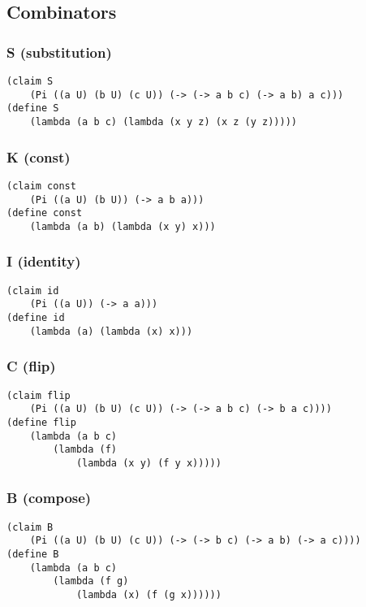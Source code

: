 \subsection{Combinators}

\subsubsection{S (substitution)} \label{code:S}
\begin{lstlisting}
(claim S
    (Pi ((a U) (b U) (c U)) (-> (-> a b c) (-> a b) a c)))
(define S
    (lambda (a b c) (lambda (x y z) (x z (y z)))))
\end{lstlisting}

\subsubsection{K (const)} \label{code:K}
\begin{lstlisting}
(claim const
    (Pi ((a U) (b U)) (-> a b a)))
(define const
    (lambda (a b) (lambda (x y) x)))
\end{lstlisting}

\subsubsection{I (identity)} \label{code:I}
\begin{lstlisting}
(claim id 
    (Pi ((a U)) (-> a a)))
(define id
    (lambda (a) (lambda (x) x)))
\end{lstlisting}

\subsubsection{C (flip)} \label{code:C}
\begin{lstlisting}
(claim flip
    (Pi ((a U) (b U) (c U)) (-> (-> a b c) (-> b a c))))
(define flip
    (lambda (a b c)
        (lambda (f)
            (lambda (x y) (f y x)))))
\end{lstlisting}

\subsubsection{B (compose)} \label{code:B}
\begin{lstlisting}
(claim B
    (Pi ((a U) (b U) (c U)) (-> (-> b c) (-> a b) (-> a c))))
(define B
    (lambda (a b c)
        (lambda (f g)
            (lambda (x) (f (g x))))))
\end{lstlisting}

